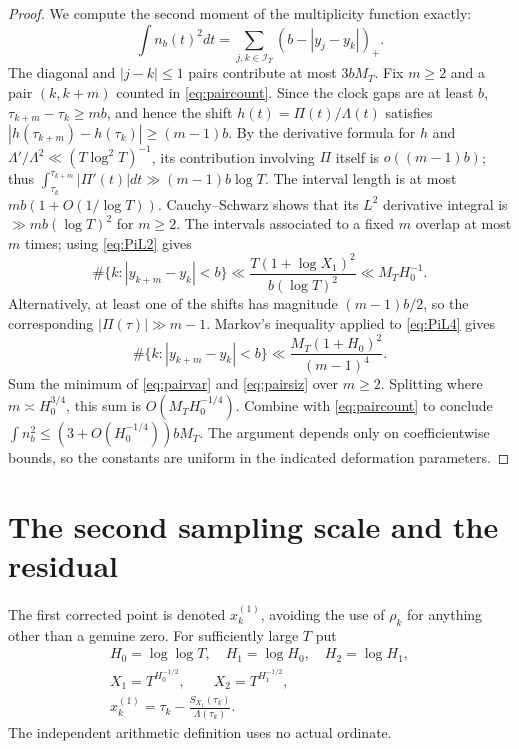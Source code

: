 \documentclass[11pt,reqno]{amsart}
\numberwithin{equation}{section}
\begin{document}
\begin{proof}
We compute the second moment of the multiplicity function exactly:
\begin{equation}\label{eq:paircount}
\int n_b(t)^2dt
=\sum_{j,k\in\mathcal I_T}(b-|y_j-y_k|)_+.
\end{equation}
The diagonal and $|j-k|\le1$ pairs contribute at most $3bM_T$.
Fix $m\ge2$ and a pair $(k,k+m)$ counted in
\eqref{eq:paircount}.  Since the clock gaps are at least $b$,
$\tau_{k+m}-\tau_k\ge mb$, and hence the shift
$h(t)=\Pi(t)/\Lambda(t)$ satisfies
$|h(\tau_{k+m})-h(\tau_k)|\ge(m-1)b$.
By the derivative formula for $h$ and $\Lambda'/\Lambda^2
\ll (T\log^2T)^{-1}$, its contribution involving $\Pi$
itself is $o((m-1)b)$; thus
$\int_{\tau_k}^{\tau_{k+m}}|\Pi'(t)|dt\gg(m-1)b\log T$.
The interval length is at most $mb(1+O(1/\log T))$.
Cauchy--Schwarz shows that its $L^2$ derivative integral is
$\gg mb(\log T)^2$ for $m\ge2$.
The intervals associated to a fixed $m$ overlap at most $m$ times;
using \eqref{eq:PiL2} gives
\begin{equation}\label{eq:pairvar}
\#\{k:|y_{k+m}-y_k|<b\}
 \ll \frac{T(1+\log X_1)^2}{b(\log T)^2}
 \ll M_T H_0^{-1}.
\end{equation}
Alternatively, at least one of the shifts has magnitude
$(m-1)b/2$, so the corresponding $|\Pi(\tau)|\gg m-1$.
Markov's inequality applied to \eqref{eq:PiL4} gives
\begin{equation}\label{eq:pairsiz}
\#\{k:|y_{k+m}-y_k|<b\}
 \ll \frac{M_T(1+H_0)^2}{(m-1)^4}.
\end{equation}
Sum the minimum of \eqref{eq:pairvar} and \eqref{eq:pairsiz}
over $m\ge2$.  Splitting where $m\asymp H_0^{3/4}$,
this sum is $O(M_TH_0^{-1/4})$.
Combine with \eqref{eq:paircount} to conclude
$\int n_b^2\le (3+O(H_0^{-1/4}))bM_T$.
The argument depends only on coefficientwise bounds, so the constants
are uniform in the indicated deformation parameters.
\end{proof}



\section{The second sampling scale and the residual}\label{sec:second}
The first corrected point is denoted $x_k^{(1)}$, avoiding the use of
$\rho_k$ for anything other than a genuine zero.
For sufficiently large $T$ put
\begin{equation}\label{eq:scales}
\begin{gathered}
H_0=\log\log T,\quad H_1=\log H_0,\quad H_2=\log H_1,\\
X_1=T^{H_0^{-1/2}},\qquad X_2=T^{H_1^{-1/2}},\\
x_k^{(1)}=\tau_k-\frac{S_{X_1}(\tau_k)}{\Lambda(\tau_k)}.
\end{gathered}
\end{equation}
The independent arithmetic definition uses no actual ordinate.
\end{document}
